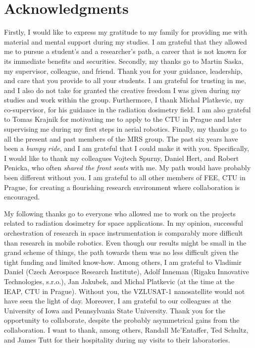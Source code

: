 
\section*{Acknowledgments}

Firstly, I would like to express my gratitude to my family for providing me with material and mental support during my studies.
I am grateful that they allowed me to pursue a student's and a researcher's path, a career that is not known for its immediate benefits and securities.
Secondly, my thanks go to Martin Saska, my supervisor, colleague, and friend.
Thank you for your guidance, leadership, and care that you provide to all your students.
I am grateful for trusting in me, and I also do not take for granted the creative freedom I was given during my studies and work within the group.
Furthermore, I thank Michal Platkevic, my co-supervisor, for his guidance in the radiation dosimetry field.
I am also grateful to Tomas Krajnik for motivating me to apply to the CTU in Prague and later supervising me during my first steps in aerial robotics.
Finally, my thanks go to all the present and past members of the MRS group.
The past six years have been a \emph{bumpy ride}, and I am grateful that I could make it with you.
Specifically, I would like to thank my colleagues Vojtech Spurny, Daniel Hert, and Robert Penicka, who often \emph{shared the front seats} with me.
My path would have probably been different without you.
I am grateful to all other members of FEE, CTU in Prague, for creating a flourishing research environment where collaboration is encouraged.

My following thanks go to everyone who allowed me to work on the projects related to radiation dosimetry for space applications.
In my opinion, successful orchestration of research in space instrumentation is comparably more difficult than research in mobile robotics.
Even though our results might be small in the grand scheme of things, the path towards them was no less difficult given the tight funding and limited know-how.
Among others, I am grateful to Vladimir Daniel (Czech Aerospace Research Institute), Adolf Inneman (Rigaku Innovative Technologies, s.r.o.), Jan Jakubek, and Michal Platkevic (at the time at the IEAP, CTU in Prague).
Without you, the VZLUSAT-1 nanosatellite would not have seen the light of day.
Moreover, I am grateful to our colleagues at the University of Iowa and Pennsylvania State University.
Thank you for the opportunity to collaborate, despite the probably asymmetrical gains from the collaboration.
I want to thank, among others, Randall Mc'Entaffer, Ted Schultz, and James Tutt for their hospitality during my visits to their laboratories.

